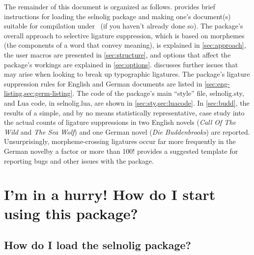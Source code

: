 \documentclass[11pt]{article}
\newcommand{\pkg}[1]{\textsf{#1}}
\begin{document}
The remainder of this document is organized as follows.  provides brief instructions for loading the \pkg{selnolig} package and making one's document(s) suitable for compilation under \LuaLaTeX\ (if you haven't already done so). The package's overall approach to selective ligature suppression, which is based on morphemes (the components of a word that convey meaning), is explained in \cref{sec:approach}, the user macros are presented in \cref{sec:structure}, and options that affect the package's workings are explained in \cref{sec:options}.  discusses further issues that may arise when looking to break up typographic ligatures. The package's ligature suppression rules for English and German documents are listed in \cref{sec:eng-listing,sec:germ-listing}. The code of the package's main ``style'' file, \pkg{selnolig.sty}, and Lua code, in \pkg{selnolig.lua}, are shown in \cref{sec:sty,sec:luacode}. In \cref{sec:budd}, the results of a simple, and by no means statistically representative, case study into the actual counts of ligature suppressions in two English novels (\emph{Call Of The Wild} and \emph{The Sea Wolf}) and one German novel (\emph{Die Buddenbrooks}) are reported. Unsurprisingly, morpheme-crossing ligatures occur far more frequently in the German novel\textemdash by a factor or more than 100!  provides a suggested template for reporting bugs and other issues with the package.



\section{I'm in a hurry! How do I start using this package?} \label{sec:hurry}

\subsection[How do I load the selnolig package?]{How do I load the \pkg{selnolig} package?}
\end{document}
